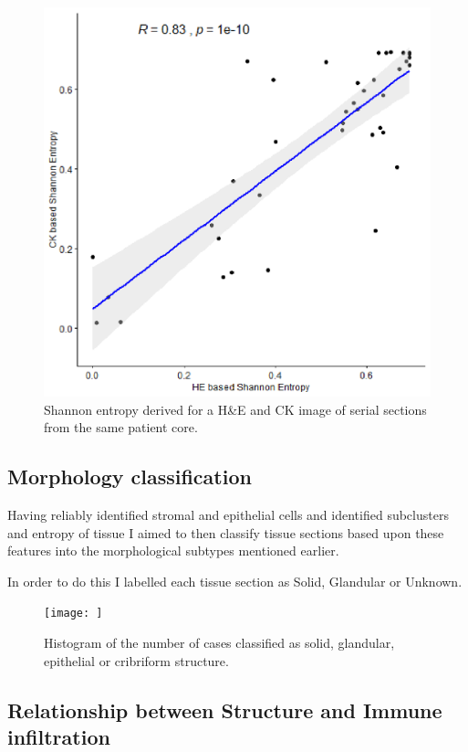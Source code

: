 \begin{figure}
    \centering
    \includegraphics{Chapter3/Figs/Thesis-06.png}
    \caption{Shannon entropy derived for a H\&E and CK image of serial sections from the same patient core.}
    \label{fig:entropy}
\end{figure}

\subsection{Morphology classification}
Having reliably identified stromal and epithelial cells and identified subclusters and entropy of tissue I aimed to then classify tissue sections based upon these features into the morphological subtypes mentioned earlier.

In order to do this I labelled each tissue section as Solid, Glandular or Unknown.
\begin{figure}
    \centering
    \texttt{[image: ]}
    \caption{Histogram of the number of cases classified as solid, glandular, epithelial  or cribriform structure.}
    \label{fig:num_classl}
\end{figure}

\subsection{Relationship between Structure and Immune infiltration}

